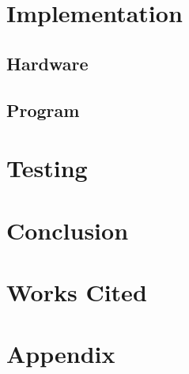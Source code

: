 \documentclass[11pt]{scrartcl}
\begin{document}
\section{Implementation}

\subsection{Hardware}
\subsection{Program}

\section{Testing}

\section{Conclusion}

\section{Works Cited}

\section{Appendix}
\end{document}
